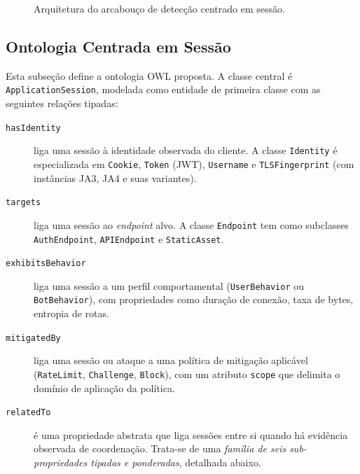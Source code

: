 \documentclass[preprint,12pt]{elsarticle}
\begin{document}
\begin{figure}[htbp]
\centering
{}
\caption{Arquitetura do arcabouço de detecção centrado em sessão.}
\label{fig:architecture}
\end{figure}

\subsection{Ontologia Centrada em Sessão}
\label{sec:approach:ontology}

Esta subseção define a ontologia OWL proposta. A classe central é \texttt{ApplicationSession}, modelada como entidade de primeira classe com as seguintes relações tipadas:

\begin{description}
    \item[\texttt{hasIdentity}] liga uma sessão à identidade observada do cliente. A classe \texttt{Identity} é especializada em \texttt{Cookie}, \texttt{Token} (JWT), \texttt{Username} e \texttt{TLSFingerprint} (com instâncias JA3, JA4 e suas variantes).
    \item[\texttt{targets}] liga uma sessão ao \emph{endpoint} alvo. A classe \texttt{Endpoint} tem como subclasses \texttt{AuthEndpoint}, \texttt{APIEndpoint} e \texttt{StaticAsset}.
    \item[\texttt{exhibitsBehavior}] liga uma sessão a um perfil comportamental (\texttt{UserBehavior} ou \texttt{BotBehavior}), com propriedades como duração de conexão, taxa de bytes, entropia de rotas.
    \item[\texttt{mitigatedBy}] liga uma sessão ou ataque a uma política de mitigação aplicável (\texttt{RateLimit}, \texttt{Challenge}, \texttt{Block}), com um atributo \texttt{scope} que delimita o domínio de aplicação da política.
    \item[\texttt{relatedTo}] é uma propriedade abstrata que liga sessões entre si quando há evidência observada de coordenação. Trata-se de uma \emph{família de seis sub-propriedades tipadas e ponderadas}, detalhada abaixo.
\end{description}
\end{document}
